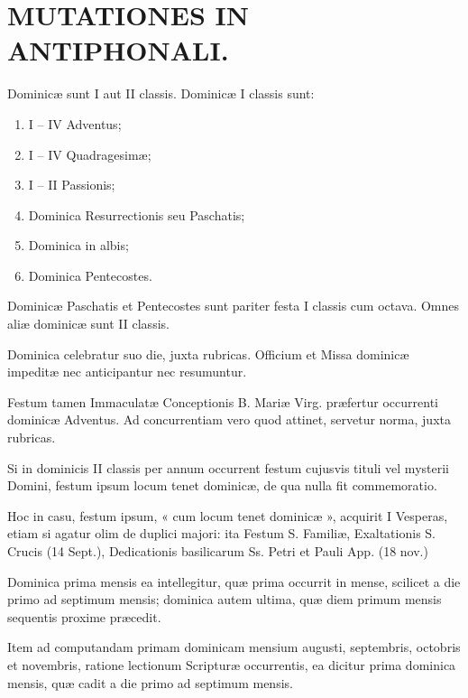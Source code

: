 \documentclass[vesperale_romanum.tex]{subfiles}
\begin{document}
\chapter[Mutationes in Antiphonali.]{MUTATIONES IN ANTIPHONALI.}
\thispagestyle{empty}


Dominicæ sunt I aut II classis. Dominicæ I classis sunt:

\begin{enumerate}[nosep,label=\alph*.]
\item I – IV Adventus;
\item I – IV Quadragesimæ;
\item I – II Passionis;
\item  Dominica Resurrectionis seu Paschatis;
\item Dominica in albis;
\item Dominica Pentecostes. %
\end{enumerate}

Dominicæ Paschatis et Pentecostes sunt pariter festa I classis cum octava. Omnes aliæ dominicæ sunt II classis.

Dominica celebratur suo die, juxta rubricas. Officium et Missa dominicæ impeditæ nec anticipantur nec resumuntur.

Festum tamen Immaculatæ Conceptionis B. Mariæ Virg. præfertur occurrenti dominicæ Adventus.
Ad concurrentiam vero quod attinet, servetur norma, juxta rubricas.

Si in dominicis II classis per annum occurrent festum cujusvis tituli vel mysterii Domini, festum ipsum locum tenet dominicæ, de qua nulla fit commemoratio.

Hoc in casu, festum ipsum, « cum locum tenet dominicæ », acquirit I Vesperas, etiam si agatur olim de duplici majori: ita Festum S. Familiæ, Exaltationis S. Crucis (14 Sept.), Dedicationis basilicarum Ss. Petri et Pauli App. (18 nov.) %

Dominica prima mensis ea intellegitur, quæ prima occurrit in mense, scilicet a die primo ad septimum mensis; dominica autem ultima, quæ diem primum mensis sequentis proxime præcedit.

Item ad computandam primam dominicam mensium augusti, septembris, octobris et novembris, ratione lectionum Scripturæ occurrentis, ea dicitur prima dominica mensis, quæ cadit a die primo ad septimum mensis.
\end{document}
